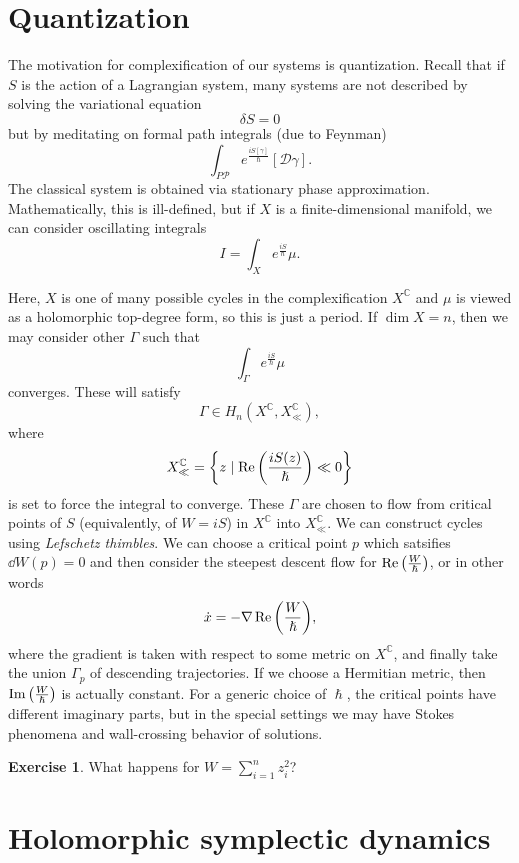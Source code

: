 \documentclass[leqno, openany]{memoir}
\theoremstyle{definition}
\newtheorem{exer}[thm]{Exercise}
\theoremstyle{remark}
\theoremstyle{plain}
\theoremstyle{definition}
\theoremstyle{remark}
\newcommand{\C}{\mathbb{C}}
\newcommand{\mc}[1]{\mathcal{#1}}
\begin{document}
\section{Quantization}
\label{sec:quantization}

The motivation for complexification of our systems is quantization. Recall that if $S$ is the action of a Lagrangian system, many systems are not described by solving the variational equation
\[ \delta S = 0 \]
but by meditating on formal path integrals (due to Feynman)
\[ \int_{P \mc{P}} e^{\frac{i S[\gamma]}{\hslash}} [\mc{D}\gamma]. \]
The classical system is obtained via stationary phase approximation. Mathematically, this is ill-defined, but if $X$ is a finite-dimensional manifold, we can consider oscillating integrals
\[ I = \int_X e^{\frac{iS}{\hslash}} \mu. \]

Here, $X$ is one of many possible cycles in the complexification $X^{\C}$ and $\mu$ is viewed as a holomorphic top-degree form, so this is just a period. If $\dim X = n$, then we may consider other $\Gamma$ such that
\[ \int_{\Gamma} e^{\frac{iS}{\hslash}} \mu \]
converges. These will satisfy
\[ \Gamma \in H_n(X^{\C}, X^{\C}_{\ll}), \]
where
\[ X^{\C}_{\ll} = \qty{z \mid \Re\qty(\frac{iS(z)}{\hslash}) \ll 0} \]
is set to force the integral to converge. These $\Gamma$ are chosen to flow from critical points of $S$ (equivalently, of $W = iS$) in $X^{\C}$ into $X^{\C}_{\ll}$. We can construct cycles using \textit{Lefschetz thimbles}. We can choose a critical point $p$ which satsifies $\dd{W}(p) = 0$ and then consider the steepest descent flow for $\Re\qty(\frac{W}{\hslash})$, or in other words
\[ \dot{x} = -\nabla \Re\qty(\frac{W}{\hslash}), \]
where the gradient is taken with respect to some metric on $X^{\C}$, and finally take the union $\Gamma_p$ of descending trajectories. If we choose a Hermitian metric, then $\Im\qty(\frac{W}{\hslash})$ is actually constant. For a generic choice of $\hslash$, the critical points have different imaginary parts, but in the special settings we may have Stokes phenomena and wall-crossing behavior of solutions.

\begin{exer}
What happens for $W = \sum_{i=1}^n z_i^2$?
\end{exer}

\section{Holomorphic symplectic dynamics}
\label{sec:hk}
\end{document}
